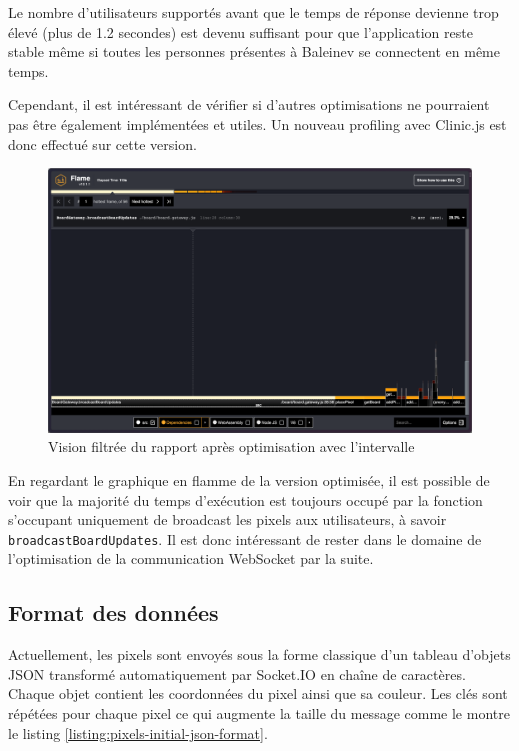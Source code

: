 Le nombre d'utilisateurs supportés avant que le temps de réponse devienne trop élevé (plus de 1.2 secondes) est devenu suffisant pour que l'application reste stable même si toutes les personnes présentes à Baleinev se connectent en même temps.

Cependant, il est intéressant de vérifier si d'autres optimisations ne pourraient pas être également implémentées et utiles. Un nouveau profiling avec Clinic.js est donc effectué sur cette version.


\begin{figure}[H]
  \centering
  \includegraphics[width=1\textwidth]{./assets/figures/flame/flame2-filtered.png}
  \caption{Vision filtrée du rapport après optimisation avec l'intervalle}
  \label{fig:flame2-filtered}
\end{figure}

En regardant le graphique en flamme de la version optimisée, il est possible de voir que la majorité du temps d'exécution est toujours occupé par la fonction s'occupant uniquement de broadcast les pixels aux utilisateurs, à savoir \texttt{broadcastBoardUpdates}. Il est donc intéressant de rester dans le domaine de l'optimisation de la communication WebSocket par la suite.

\subsection{Format des données}

Actuellement, les pixels sont envoyés sous la forme classique d'un tableau d'objets JSON transformé automatiquement par Socket.IO en chaîne de caractères. Chaque objet contient les coordonnées du pixel ainsi que sa couleur. Les clés sont répétées pour chaque pixel ce qui augmente la taille du message comme le montre le listing \ref{listing:pixels-initial-json-format}.

